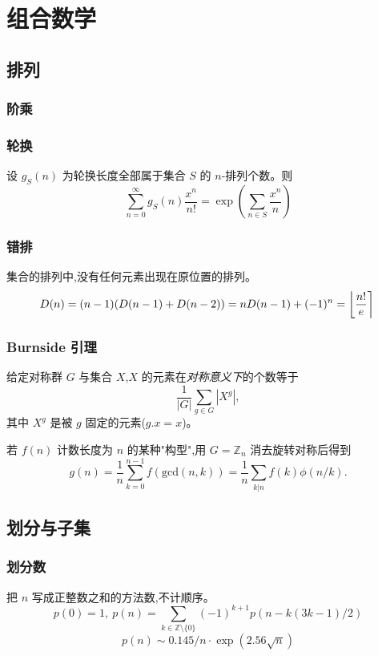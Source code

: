 \chapter{组合数学}

\section{排列}
	\subsection{阶乘}
		

	\subsection{轮换}
		设 $g_S(n)$ 为轮换长度全部属于集合 $S$ 的 $n$-排列个数。则
		$$\sum_{n=0} ^\infty g_S(n) \frac{x^n}{n!} = \exp\left(\sum_{n\in S} \frac{x^n} {n} \right)$$

	\subsection{错排}
		集合的排列中,没有任何元素出现在原位置的排列。
		\[ \mkern-2mu D(n) = (n-1)(D(n-1)+D(n-2)) = n D(n-1)+(-1)^n = \left\lfloor\frac{n!}{e}\right\rceil \]

	\subsection{Burnside 引理}
		给定对称群 $G$ 与集合 $X$,$X$ 的元素在\emph{对称意义下}的个数等于
		 \[ {\frac {1}{|G|}}\sum _{{g\in G}}|X^{g}|, \]
		 其中 $X^{g}$ 是被 $g$ 固定的元素($g.x = x$)。

		 若 $f(n)$ 计数长度为 $n$ 的某种"构型",用 $G = \mathbb Z_n$ 消去旋转对称后得到
		 \[ g(n) = \frac 1 n \sum_{k=0}^{n-1}{f(\text{gcd}(n, k))} = \frac 1 n \sum_{k|n}{f(k)\phi(n/k)}. \]

\section{划分与子集}
	\subsection{划分数}
		把 $n$ 写成正整数之和的方法数,不计顺序。
		\[ p(0) = 1,\ p(n) = \sum_{k \in \mathbb Z \setminus \{0\}}{(-1)^{k+1} p(n - k(3k-1) / 2)} \]
		\[ p(n) \sim 0.145 / n \cdot \exp(2.56 \sqrt{n}) \]

